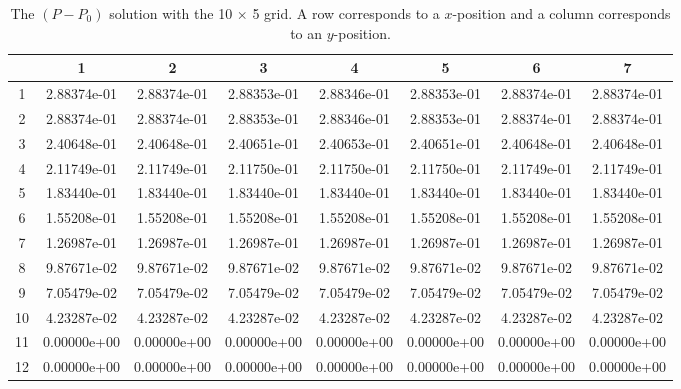 \documentclass{article}
\begin{document}
\def\arraystretch{1.3}
\begin{table}[H]
	\scriptsize
	\centering
	\caption{The $(P - P_0)$ solution with the 10 $\times$ 5 grid. A row corresponds to a $x$-position and a column corresponds to an $y$-position.}
	\vspace{0.2cm}
	\begin{tabular}{c|S|S|S|S|S|S|S}
		& {1} & {2} & {3} & {4} & {5} & {6} & {7} \\
		 & 2.88374e-01 & 2.88374e-01 & 2.88353e-01 & 2.88346e-01 & 2.88353e-01 & 2.88374e-01 & 2.88374e-01 \\
        2 & 2.88374e-01 & 2.88374e-01 & 2.88353e-01 & 2.88346e-01 & 2.88353e-01 & 2.88374e-01 & 2.88374e-01 \\
        3 & 2.40648e-01 & 2.40648e-01 & 2.40651e-01 & 2.40653e-01 & 2.40651e-01 & 2.40648e-01 & 2.40648e-01 \\
        4 & 2.11749e-01 & 2.11749e-01 & 2.11750e-01 & 2.11750e-01 & 2.11750e-01 & 2.11749e-01 & 2.11749e-01 \\
        5 & 1.83440e-01 & 1.83440e-01 & 1.83440e-01 & 1.83440e-01 & 1.83440e-01 & 1.83440e-01 & 1.83440e-01 \\
        6 & 1.55208e-01 & 1.55208e-01 & 1.55208e-01 & 1.55208e-01 & 1.55208e-01 & 1.55208e-01 & 1.55208e-01 \\
        7 & 1.26987e-01 & 1.26987e-01 & 1.26987e-01 & 1.26987e-01 & 1.26987e-01 & 1.26987e-01 & 1.26987e-01 \\
        8 & 9.87671e-02 & 9.87671e-02 & 9.87671e-02 & 9.87671e-02 & 9.87671e-02 & 9.87671e-02 & 9.87671e-02 \\
        9 & 7.05479e-02 & 7.05479e-02 & 7.05479e-02 & 7.05479e-02 & 7.05479e-02 & 7.05479e-02 & 7.05479e-02 \\
        10 & 4.23287e-02 & 4.23287e-02 & 4.23287e-02 & 4.23287e-02 & 4.23287e-02 & 4.23287e-02 & 4.23287e-02 \\
        11 & 0.00000e+00 & 0.00000e+00 & 0.00000e+00 & 0.00000e+00 & 0.00000e+00 & 0.00000e+00 & 0.00000e+00 \\
        12 & 0.00000e+00 & 0.00000e+00 & 0.00000e+00 & 0.00000e+00 & 0.00000e+00 & 0.00000e+00 & 0.00000e+00 \\
	\end{tabular}
	\label{table:coarse-p-p0}
\end{table}
\end{document}

